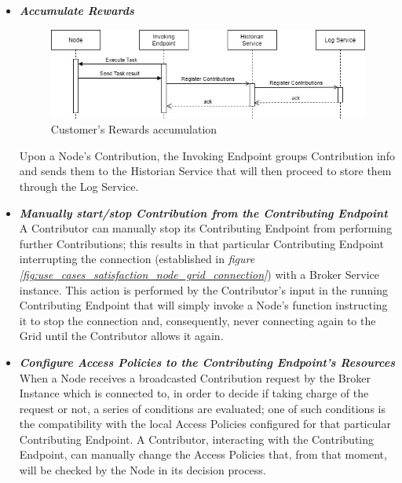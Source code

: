 \begin{itemize}
    \begin{itemize}
        \item \textbf{\textit{Accumulate Rewards}}\\
        \begin{figure}[!ht]
            \centering
            \includegraphics[scale=0.6]{document/chapters/chapter_6/images/use_cases_satisfaction_rewards_accumulation.jpg}
            \caption{Customer's Rewards accumulation}
            \label{fig:use_cases_satisfaction_rewards_accumulation}
        \end{figure}

        Upon a Node's Contribution, the Invoking Endpoint groups Contribution info and sends them to the Historian Service that will then proceed to store them through the Log Service.

        \item \textbf{\textit{Manually start/stop Contribution from the Contributing Endpoint}}\\
        A Contributor can manually stop its Contributing Endpoint from performing further Contributions; this results in that particular Contributing Endpoint interrupting the connection (established in \textit{figure \ref{fig:use_cases_satisfaction_node_grid_connection}}) with a Broker Service instance.
        This action is performed by the Contributor's input in the running Contributing Endpoint that will simply invoke a Node's function instructing it to stop the connection and, consequently, never connecting again to the Grid until the Contributor allows it again.

        \item \textbf{\textit{Configure Access Policies to the Contributing Endpoint's Resources}}\\
        When a Node receives a broadcasted Contribution request by the Broker Instance which is connected to, in order to decide if taking charge of the request or not, a series of conditions are evaluated; one of such conditions is the compatibility with the local Access Policies configured for that particular Contributing Endpoint. 
        A Contributor, interacting with the Contributing Endpoint, can manually change the Access Policies that, from that moment, will be checked by the Node in its decision process. 


\end{itemize}
\end{itemize}
